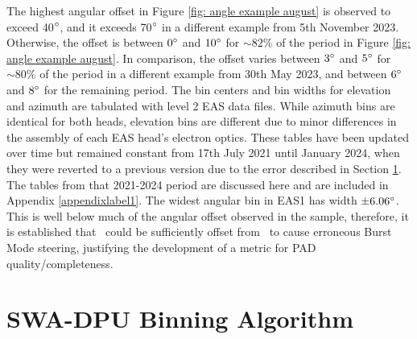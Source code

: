 The highest angular offset in Figure \ref{fig: angle example august} is observed to exceed 40\(\degree\), and it exceeds 70\(\degree\) in a different example from 5th November 2023. Otherwise, the offset is between \(0\degree\) and \(10\degree\) for \(\sim82\%\) of the period in Figure \ref{fig: angle example august}. In comparison, the offset varies between \(3\degree\) and \(5\degree\) for \(\sim80\%\) of the period in a different example from 30th May 2023, and between \(6\degree\) and \(8\degree\) for the remaining period. The bin centers and bin widths for elevation and azimuth are tabulated with level 2 EAS data files. While azimuth bins are identical for both heads, elevation bins are different due to minor differences in the assembly of each EAS head's electron optics. These tables have been updated over time but remained constant from 17th July 2021 until January 2024, when they were reverted to a previous version due to the error described in Section \ref{sim steering}. The tables from that 2021-2024 period are discussed here and are included in Appendix \ref{appendixlabel1}. The widest angular bin in EAS1 has width \(\pm6.06\degree\). This is well below much of the angular offset observed in the sample, therefore, it is established that \Beas\ could be sufficiently offset from \Bmag\ to cause erroneous Burst Mode steering, justifying the development of a metric for PAD quality/completeness.
\newpage

\section{SWA-DPU Binning Algorithm} \label{sim steering}

